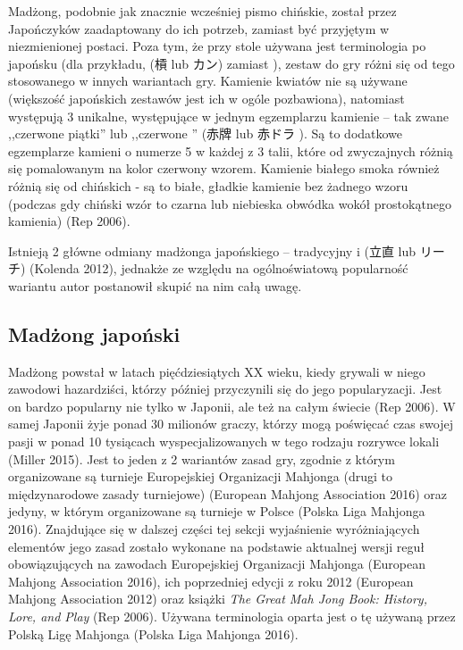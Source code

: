 Madżong, podobnie jak znacznie wcześniej pismo chińskie, został przez
Japończyków zaadaptowany do ich potrzeb, zamiast być przyjętym w niezmienionej
postaci. Poza tym, że przy stole używana jest terminologia po japońsku (dla
przykładu,  (槓 lub カン) zamiast ), zestaw do gry różni
się od tego stosowanego w innych wariantach gry. Kamienie kwiatów nie są używane
(większość japońskich zestawów jest ich w ogóle pozbawiona), natomiast
występują 3 unikalne, występujące w jednym egzemplarzu kamienie -- tak zwane
,,czerwone piątki'' lub ,,czerwone '' (赤牌  lub 赤ドラ
). Są to dodatkowe egzemplarze kamieni o numerze 5 w każdej z 3
talii, które od zwyczajnych różnią się pomalowanym na kolor czerwony wzorem.
Kamienie białego smoka również różnią się od chińskich - są to białe, gładkie
kamienie bez żadnego wzoru (podczas gdy chiński wzór to czarna lub niebieska
obwódka wokół prostokątnego kamienia) (Rep 2006).

Istnieją 2 główne odmiany madżonga japońskiego -- tradycyjny i 
(立直 lub リーチ) (Kolenda 2012), jednakże ze względu na ogólnoświatową popularność
wariantu  autor postanowił skupić na nim całą uwagę.
% 

\subsection{Madżong japoński }
\label{rīchi}
Madżong  powstał w latach pięćdziesiątych XX wieku, kiedy grywali
w niego zawodowi hazardziści, którzy później przyczynili się do jego
popularyzacji. Jest on bardzo popularny nie tylko w Japonii, ale też na
całym świecie (Rep 2006). W samej Japonii żyje ponad 30 milionów graczy, którzy
mogą poświęcać czas swojej pasji w ponad 10 tysiącach wyspecjalizowanych w tego
rodzaju rozrywce lokali (Miller 2015).
Jest to jeden z 2 wariantów zasad gry, zgodnie z którym organizowane są turnieje
Europejskiej Organizacji Mahjonga (drugi to międzynarodowe zasady turniejowe)
(European Mahjong Association 2016) oraz jedyny, w którym organizowane są
turnieje w Polsce (Polska Liga Mahjonga 2016).
Znajdujące się w dalszej części tej sekcji wyjaśnienie wyróżniających elementów
jego zasad zostało wykonane na podstawie aktualnej wersji reguł obowiązujących
na zawodach Europejskiej Organizacji Mahjonga (European Mahjong Association
2016), ich poprzedniej edycji z roku 2012 (European Mahjong Association 2012)
oraz książki \textit{The Great Mah Jong Book: History, Lore, and Play} (Rep
2006). Używana terminologia oparta jest o tę używaną przez Polską Ligę Mahjonga
(Polska Liga Mahjonga 2016).

